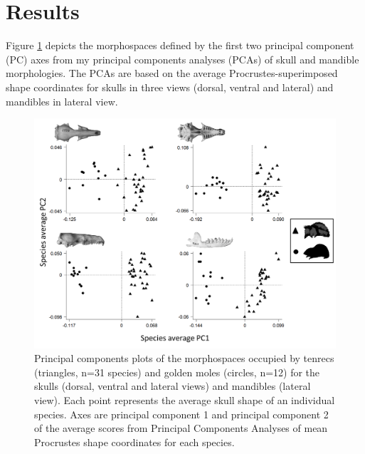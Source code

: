 	
	

\section{Results}
\label{sect:results}

	Figure \ref{fig:FourPCA} depicts the morphospaces defined by the first two principal component (PC) axes from my principal components analyses (PCAs) of skull and mandible morphologies. The PCAs are based on the average Procrustes-superimposed shape coordinates for skulls in three views (dorsal, ventral and lateral) and mandibles in lateral view.

	
	\begin{figure}[!htbp]
	\centering
	\includegraphics[width=1\linewidth]{Disparity/writing/figures/FourPCA_shapes.png}
	\caption[Morphospace (principal components) plot of morphological diversity in lateral views of tenrec and golden mole skulls.]
		{Principal components plots of the morphospaces occupied by tenrecs (triangles, n=31 species) and golden moles (circles, n=12) for the skulls (dorsal, ventral and lateral views) and mandibles (lateral view). Each point represents the average skull shape of an individual species. Axes are principal component 1 and principal component 2 of the average scores from Principal Components Analyses of mean Procrustes shape coordinates for each species.}
	\label{fig:FourPCA}
	\end{figure}

